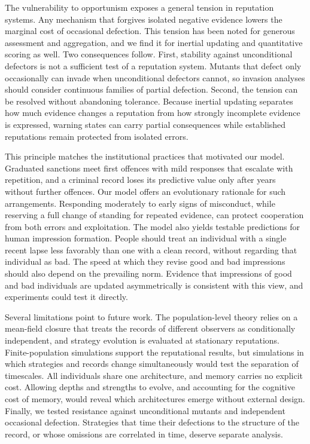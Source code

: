 \documentclass[fleqn,10pt]{wlscirep}
\theoremstyle{plain}
\begin{document}
The vulnerability to opportunism exposes a general tension in reputation systems. Any mechanism that forgives isolated negative evidence lowers the marginal cost of occasional defection. This tension has been noted for generous assessment\cite{schmid2021} and aggregation\cite{michelmata2024}, and we find it for inertial updating and quantitative scoring as well. Two consequences follow. First, stability against unconditional defectors is not a sufficient test of a reputation system. Mutants that defect only occasionally can invade when unconditional defectors cannot, so invasion analyses should consider continuous families of partial defection. Second, the tension can be resolved without abandoning tolerance. Because inertial updating separates how much evidence changes a reputation from how strongly incomplete evidence is expressed, warning states can carry partial consequences while established reputations remain protected from isolated errors.

This principle matches the institutional practices that motivated our model. Graduated sanctions meet first offences with mild responses that escalate with repetition\cite{ostrom1990,cox2010}, and a criminal record loses its predictive value only after years without further offences\cite{blumstein2009}. Our model offers an evolutionary rationale for such arrangements. Responding moderately to early signs of misconduct, while reserving a full change of standing for repeated evidence, can protect cooperation from both errors and exploitation. The model also yields testable predictions for human impression formation. People should treat an individual with a single recent lapse less favorably than one with a clean record, without regarding that individual as bad. The speed at which they revise good and bad impressions should also depend on the prevailing norm. Evidence that impressions of good and bad individuals are updated asymmetrically\cite{siegel2018,mendesiedlecki2013diagnostic} is consistent with this view, and experiments could test it directly.

Several limitations point to future work. The population-level theory relies on a mean-field closure that treats the records of different observers as conditionally independent, and strategy evolution is evaluated at stationary reputations. Finite-population simulations support the reputational results, but simulations in which strategies and records change simultaneously would test the separation of timescales. All individuals share one architecture, and memory carries no explicit cost. Allowing depths and strengths to evolve, and accounting for the cognitive cost of memory, would reveal which architectures emerge without external design. Finally, we tested resistance against unconditional mutants and independent occasional defection. Strategies that time their defections to the structure of the record, or whose omissions are correlated in time, deserve separate analysis.
\end{document}
